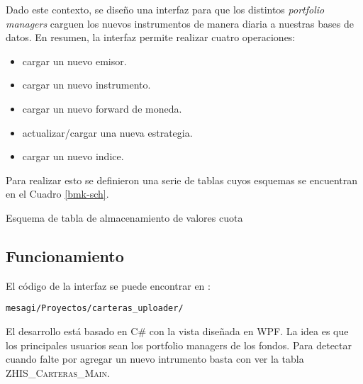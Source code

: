 \documentclass{article}
\begin{document}
Dado este contexto, se diseño una interfaz para que los distintos \emph{portfolio managers} carguen los nuevos instrumentos de manera diaria a nuestras bases de datos. En resumen, la interfaz permite realizar cuatro operaciones:
\begin{itemize}
	\item cargar un nuevo emisor.
	\item cargar un nuevo instrumento.
	\item cargar un nuevo forward de moneda.
	\item actualizar/cargar una nueva estrategia.
  \item cargar un nuevo indice.
\end{itemize}

Para realizar esto se definieron una serie de tablas cuyos esquemas se encuentran en el Cuadro \ref{bmk-sch}.

\begin{table}[h]
{\small
{}}
\caption{Esquema de tabla de almacenamiento de valores cuota}
\label{bmk-sch}
\end{table}


\subsection{Funcionamiento}

El código de la interfaz se puede encontrar en :
\begin{center}
\texttt{mesagi/Proyectos/carteras\_uploader/}
\end{center}
El desarrollo está basado en C\# con la vista diseñada en WPF. La idea es que los principales usuarios sean los portfolio managers de los fondos. Para detectar cuando falte por agregar un nuevo intrumento basta con ver la tabla \textsc{ZHIS\_Carteras\_Main}.
\end{document}
